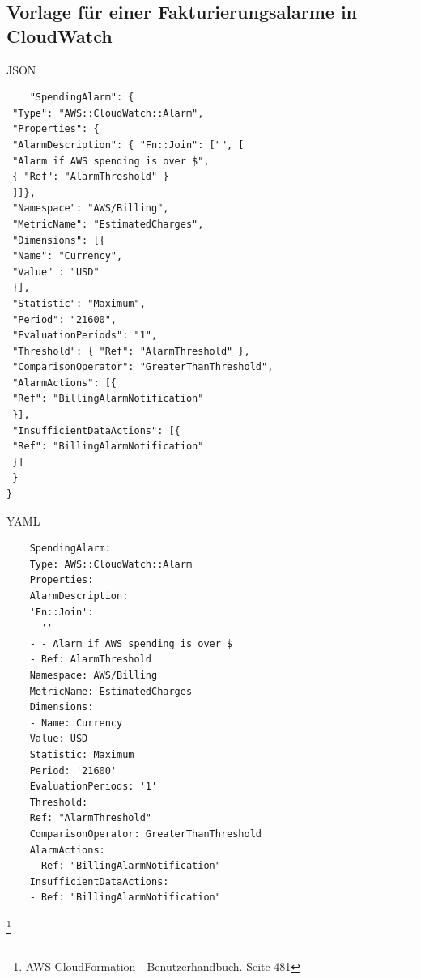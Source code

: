 \appendix
\renewcommand{\thesubsection}{\Roman{subsection}}
\subsection{Vorlage für einer Fakturierungsalarme in CloudWatch}\label{sec_Ang_A}
JSON\\
\begin{lstlisting}
    "SpendingAlarm": {
 "Type": "AWS::CloudWatch::Alarm",
 "Properties": {
 "AlarmDescription": { "Fn::Join": ["", [
 "Alarm if AWS spending is over $",
 { "Ref": "AlarmThreshold" }
 ]]},
 "Namespace": "AWS/Billing",
 "MetricName": "EstimatedCharges",
 "Dimensions": [{
 "Name": "Currency",
 "Value" : "USD"
 }],
 "Statistic": "Maximum",
 "Period": "21600",
 "EvaluationPeriods": "1",
 "Threshold": { "Ref": "AlarmThreshold" },
 "ComparisonOperator": "GreaterThanThreshold",
 "AlarmActions": [{
 "Ref": "BillingAlarmNotification"
 }],
 "InsufficientDataActions": [{
 "Ref": "BillingAlarmNotification"
 }]
 }
}
\end{lstlisting}

YAML
\\
\begin{lstlisting}
    SpendingAlarm:
    Type: AWS::CloudWatch::Alarm
    Properties:
    AlarmDescription:
    'Fn::Join':
    - ''
    - - Alarm if AWS spending is over $
    - Ref: AlarmThreshold
    Namespace: AWS/Billing
    MetricName: EstimatedCharges
    Dimensions:
    - Name: Currency
    Value: USD
    Statistic: Maximum
    Period: '21600'
    EvaluationPeriods: '1'
    Threshold:
    Ref: "AlarmThreshold"
    ComparisonOperator: GreaterThanThreshold
    AlarmActions:
    - Ref: "BillingAlarmNotification"
    InsufficientDataActions:
    - Ref: "BillingAlarmNotification"
\end{lstlisting}
\footnote{\cite{AMZ32}AWS CloudFormation - Benutzerhandbuch. Seite 481}

